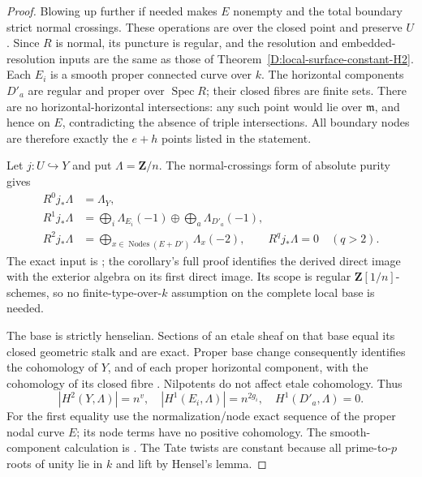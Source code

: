 \begin{proof}
Blowing up further if needed makes $E$ nonempty and the total
boundary strict normal crossings. These operations are over the
closed point and preserve $U$. Since $R$ is normal, its puncture
is regular, and the resolution and embedded-resolution inputs
are the same as those of
Theorem~\ref{D:local-surface-constant-H2}.
Each $E_i$ is a smooth proper connected curve over $k$.
The horizontal components $D'_a$ are regular and proper over
$\operatorname{Spec}R$; their closed fibres are finite sets.
There are no horizontal-horizontal intersections: any such point
would lie over $\mathfrak m$, and hence on $E$, contradicting the
absence of triple intersections. All boundary nodes are therefore
exactly the $e+h$ points listed in the statement.

Let $j:U\hookrightarrow Y$ and put $\Lambda=\mathbf Z/n$.
The normal-crossings form of absolute purity gives
\[
 \begin{aligned}
 R^0j_*\Lambda&=\Lambda_Y,\\
 R^1j_*\Lambda&=
   \bigoplus_i\Lambda_{E_i}(-1)
       \oplus\bigoplus_a\Lambda_{D'_a}(-1),\\
 R^2j_*\Lambda&=\bigoplus_{x\in\operatorname{Nodes}(E+D')}
                                      \Lambda_x(-2),
 \qquad R^qj_*\Lambda=0\quad(q>2).
 \end{aligned}
 \tag{D.LDH.2}
\]
The exact input is \citet[Expose~XVI, Theorem~3.1.1 and
Corollary~3.1.3, pp.~242--243]{A_ILO2014}; the corollary's full
proof identifies the derived direct image with the exterior
algebra on its first direct image. Its scope is regular
$\mathbf Z[1/n]$-schemes, so no finite-type-over-$k$ assumption
on the complete local base is needed.

The base is strictly henselian. Sections of an etale sheaf on
that base equal its closed geometric stalk and are exact.
Proper base change consequently identifies the cohomology of
$Y$, and of each proper horizontal component, with the
cohomology of its closed fibre
\citep[Theorem~59.91.11, Tag~095T, complete written proof]
{StacksSemilinearDeterminantsB}.
Nilpotents do not affect etale cohomology. Thus
\[
 |H^2(Y,\Lambda)|=n^v,
 \quad |H^1(E_i,\Lambda)|=n^{2g_i},
 \quad H^1(D'_a,\Lambda)=0.
 \tag{D.LDH.3}
\]
For the first equality use the normalization/node exact sequence
of the proper nodal curve $E$; its node terms have no positive
cohomology. The smooth-component calculation is
\citep[Lemma~59.69.1, Tag~03RQ]{StacksLocalPairCohomologyB}.
The Tate twists are constant because all prime-to-$p$ roots of
unity lie in $k$ and lift by Hensel's lemma.


\end{proof}

